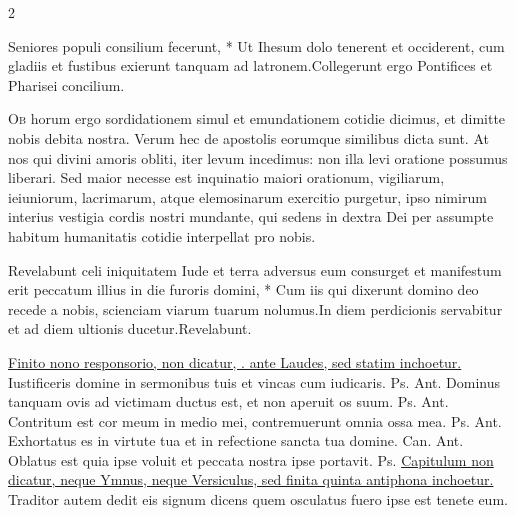 \begin{multicols*}{2}
\begin{responsory}
{Seniores populi consilium fecerunt, * Ut Ihesum dolo tenerent et occiderent, cum gladiis et fustibus exierunt tanquam ad latronem.}{Collegerunt ergo Pontifices et Pharisei concilium.}
\end{responsory}%
\lettrine[lines=2]{\zallmancaps \color{Blue} O}{b} horum ergo sordidationem simul et emundationem cotidie dicimus, et dimitte nobis debita nostra. Verum hec de apostolis eorumque similibus dicta sunt. At nos qui divini amoris obliti, iter levum incedimus: non illa levi oratione possumus liberari. Sed maior necesse est inquinatio maiori orationum, vigiliarum, ieiuniorum, lacrimarum, atque elemosinarum exercitio purgetur, ipso nimirum interius vestigia cordis nostri mundante, qui sedens in dextra Dei per assumpte habitum humanitatis cotidie interpellat pro nobis.
\begin{responsory}
{Revelabunt celi iniquitatem Iude et terra adversus eum consurget et manifestum erit peccatum illius in die furoris domini, * Cum iis qui dixerunt domino deo recede a nobis, scienciam viarum tuarum nolumus.}{In diem perdicionis servabitur et ad diem ultionis ducetur.}Revelabunt.
\end{responsory}%
\newline \ul{Finito nono responsorio, non dicatur, \Vbar . ante Laudes, sed statim inchoetur.}
 Iustificeris domine in sermonibus tuis et vincas cum iudicaris. {\color{Red} Ps.}  {\color{Red} Ant.} Dominus tanquam ovis ad victimam ductus est, et non aperuit os suum. {\color{Red} Ps.}  {\color{Red} Ant.} Contritum est cor meum in medio mei, contremuerunt omnia ossa mea. {\color{Red} Ps.}  {\color{Red} Ant.} Exhortatus es in virtute tua et in refectione sancta tua domine. {\color{Red} Can.}  {\color{Red} Ant.} Oblatus est quia ipse voluit et peccata nostra ipse portavit. {\color{Red} Ps.}  \ul{Capitulum non dicatur, neque Ymnus, neque Versiculus, sed finita quinta antiphona inchoetur.}
 Traditor autem dedit eis signum dicens quem osculatus fuero ipse est tenete eum.

\end{multicols*}
